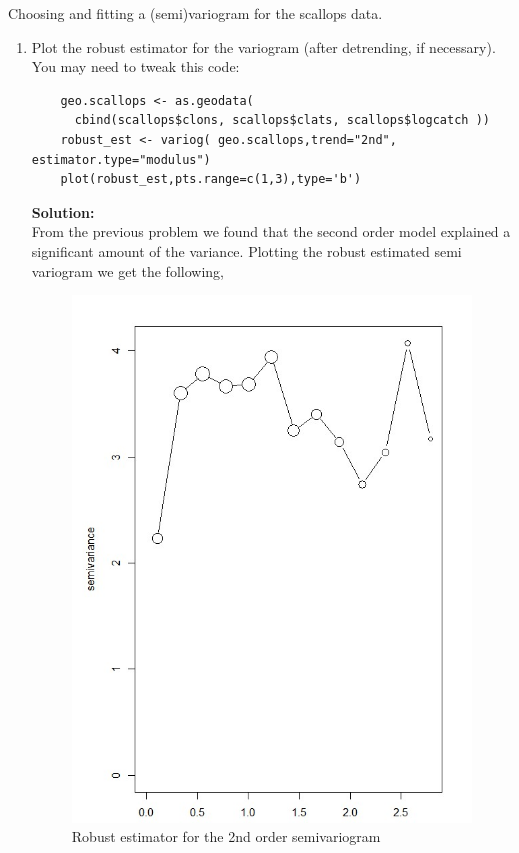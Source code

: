 \documentclass[12pt]{article}
\makeatletter
\theoremstyle{homework}
\newenvironment{exercise}[1]
{\def\@currentlabel{#1}\exercisecore}
{\endexercisecore}
\newcommand{\localhead}[1]{\par\smallskip\noindent\textbf{#1}\nobreak\\}%
\newcommand\solution{\localhead{Solution:}}
\makeatother
\begin{document}
\begin{exercise}{4} Choosing and fitting a (semi)variogram for the scallops data.\\
  \begin{enumerate}
  \item  Plot the robust estimator for the variogram 
  (after detrending, if necessary). You may need to tweak this code:
  \begin{verbatim}
    geo.scallops <- as.geodata( 
      cbind(scallops$clons, scallops$clats, scallops$logcatch ))
    robust_est <- variog( geo.scallops,trend="2nd", estimator.type="modulus")
    plot(robust_est,pts.range=c(1,3),type='b')
  \end{verbatim}
  \solution From the previous problem we found that the second order model explained a significant amount 
  of the variance. Plotting the robust estimated semi variogram we get the following, 
  \begin{figure}[H]
    \begin{center}
      \caption{Robust estimator for the 2nd order semivariogram}
    \includegraphics[width = .70\textwidth]{Rplot05.jpg}
    \end{center}
  \end{figure}
  










\end{enumerate}
\end{exercise}
\end{document}
